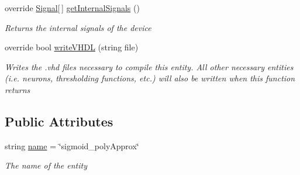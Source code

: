 \begin{DoxyCompactItemize}
override \hyperlink{class_n_n_gen_1_1_signal}{Signal}\mbox{[}$\,$\mbox{]} \hyperlink{class_n_n_gen_1_1_sigmoid___poly_approx_aa9ea30f1d5fa7e2ff1874f00e37deffb}{get\+Internal\+Signals} ()
\begin{DoxyCompactList}\small\item\em Returns the internal signals of the device \end{DoxyCompactList}\item 
override bool \hyperlink{class_n_n_gen_1_1_sigmoid___poly_approx_a1d78cd23e2a1f4e686980052ad8c7a44}{write\+V\+H\+D\+L} (string file)
\begin{DoxyCompactList}\small\item\em Writes the .vhd files necessary to compile this entity. All other necessary entities (i.\+e. neurons, thresholding functions, etc.) will also be written when this function returns \end{DoxyCompactList}\end{DoxyCompactItemize}
\subsection*{Public Attributes}
\begin{DoxyCompactItemize}
\item 
string \hyperlink{class_n_n_gen_1_1_sigmoid___poly_approx_ae95905d2d05007afee1e105e93c64045}{name} = \char`\"{}sigmoid\+\_\+poly\+Approx\char`\"{}
\begin{DoxyCompactList}\small\item\em The name of the entity \end{DoxyCompactList}\end{DoxyCompactItemize}
